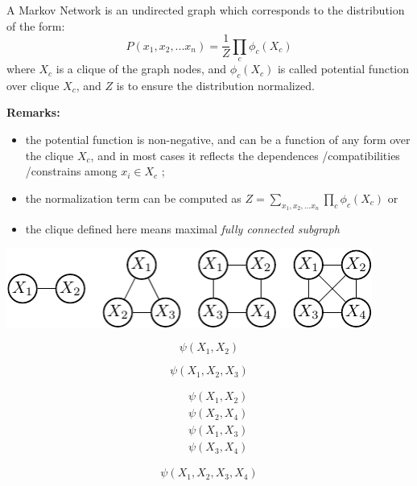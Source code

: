 \begin{definition}
 A Markov Network is an undirected graph which corresponds to the distribution of the form:
 \begin{equation}
  P(x_1,x_2,...x_n)=\frac{1}{Z}\prod_{c}\phi_c(X_c)
 \end{equation}
where $X_c$ is a clique of the graph nodes, and $\phi_c(X_c)$ is called potential function over clique $X_c$, and $Z$ is to ensure the distribution normalized.
\end{definition}
\textbf{Remarks:}
\begin{itemize}
 \item the potential function is non-negative, and can be a function of any form over the clique $X_c$, and in most cases it reflects the dependences /compatibilities /constrains among $x_i\in X_c$ ;
 \item the normalization term can be computed as $Z=\sum_{x_1,x_2,...x_n}\prod_{c}\phi_c(X_c)$ or 
 \item the clique defined here means maximal \emph{fully connected subgraph}
\end{itemize}

\includegraphics[width=0.9\textwidth]{./Figures/clique}\newline

\begin{minipage}[c]{0.22\textwidth}
 \begin{equation*}
  \psi(X_1,X_2)
 \end{equation*}
\end{minipage}
\begin{minipage}[c]{0.22\textwidth}
 \begin{equation*}
  \psi(X_1,X_2,X_3)
 \end{equation*}
\end{minipage}
\begin{minipage}[c]{0.25\textwidth}
 \begin{equation*}
  \begin{array}{rcl}
   && \psi(X_1,X_2)\\
   && \psi(X_2,X_4)\\
   && \psi(X_1,X_3)\\
   && \psi(X_3,X_4)
  \end{array}
 \end{equation*}
\end{minipage}
\begin{minipage}[c]{0.22\textwidth}
 \begin{equation*}
 \psi(X_1,X_2,X_3,X_4)
 \end{equation*}
\end{minipage}


